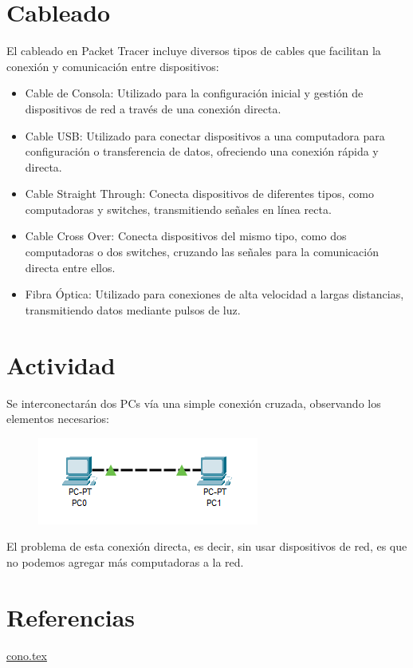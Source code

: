 \documentclass{article}
\begin{document}
\section{Cableado}
    El cableado en Packet Tracer incluye diversos tipos de cables que facilitan la conexión y comunicación entre dispositivos:
        \begin{itemize}
            \item Cable de Consola: Utilizado para la configuración inicial y gestión de dispositivos de red a través de una conexión directa.
            \item Cable USB: Utilizado para conectar dispositivos a una computadora para configuración o transferencia de datos, ofreciendo una conexión rápida y directa.
            \item Cable Straight Through: Conecta dispositivos de diferentes tipos, como computadoras y switches, transmitiendo señales en línea recta.
            \item Cable Cross Over: Conecta dispositivos del mismo tipo, como dos computadoras o dos switches, cruzando las señales para la comunicación directa entre ellos.
            \item Fibra Óptica: Utilizado para conexiones de alta velocidad a largas distancias, transmitiendo datos mediante pulsos de luz.
        \end{itemize}
\section{Actividad}
    Se interconectarán dos PCs vía una simple conexión cruzada, observando los elementos necesarios:
    
    \begin{figure}[h]
        \centering
        \includegraphics[width=0.5\linewidth]{pcs.png}
    \end{figure}
    El problema de esta conexión directa, es decir, sin usar dispositivos de red, es que no podemos agregar más computadoras a la red.
\section{Referencias}
    \href{https://github.com/diego-g-cono/diego-g-cono/blob/master/cono.tex}{cono.tex}
\end{document}
